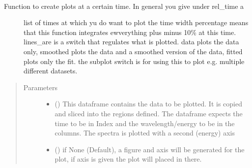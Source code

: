 \documentclass[letterpaper,10pt,english]{sphinxmanual}
\begin{document}
\begin{fulllineitems}
\label{\detokenize{plot_func:plot_func.plot_time}}~\begin{description}
\item[{Function to create plots at a certain time. In general you give under rel\_time a}] \leavevmode
list of times at which yu do want to plot the time width percentage means that
this function integrates ewverything plus minus 10\% at this time. lines\_are is a
switch that regulates what is plotted. data plots the data only,
smoothed plots the data and a smoothed version of the data, fitted plots only the fit.
the subplot switch is for using this to plot e.g. multiple different datasets.

\end{description}
\begin{quote}\begin{description}
\item[{Parameters}] \leavevmode\begin{itemize}
\item {} 
 () \textendash{} This dataframe contains the data to be plotted. It is copied and sliced into the
regions defined. The dataframe expects the time to be in Index and the wavelength/energy
to be in the columns. The spectra is plotted with a second (energy) axis

\item {} 
 (\sphinxstyleliteralemphasis{\sphinxupquote{, }}) \textendash{} if None (Default), a figure and axis will be generated for the plot, if axis is given the plot will
placed in there.


\end{itemize}
\end{description}
\end{quote}
\end{fulllineitems}
\end{document}

